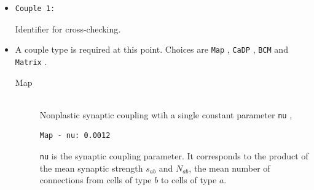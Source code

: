 \documentclass[12pt,a4paper]{article}
\newcommand{\type}[1]{ {\small\small\tt #1} }
\begin{document}
\begin{itemize}

	\item
	\begin{lstlisting}
Couple 1:
	\end{lstlisting}
	Identifier for cross-checking.
\item A couple type is required at this point. Choices are \type{Map}, \type{CaDP}, \type{BCM} and \type{Matrix}.

\begin{description}

	\item[Map]\ \\
	Nonplastic synaptic coupling wtih a single constant parameter \type{nu},
	\begin{lstlisting}
Map - nu: 0.0012
	\end{lstlisting}
	\type{nu} is the synaptic coupling parameter. It corresponds to the product of the mean synaptic strength $s_{ab}$ and $N_{ab}$, the mean number of connections from cells of type $b$ to cells of type $a$.





\end{description}
\end{itemize}
\end{document}
